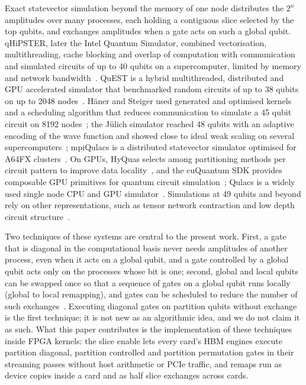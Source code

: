 \documentclass[pdflatex,sn-mathphys-num]{sn-jnl}
\theoremstyle{thmstyleone}
\theoremstyle{thmstylethree}
\begin{document}
Exact statevector simulation beyond the memory of one node distributes the $2^n$ amplitudes over many processes,
each holding a contiguous slice selected by the top qubits, and exchanges amplitudes when a gate acts on such a global
qubit. qHiPSTER, later the Intel Quantum Simulator, combined vectorisation, multithreading, cache blocking and
overlap of computation with communication and simulated circuits of up to 40 qubits on a supercomputer, limited by
memory and network bandwidth~\cite{smelyanskiy2016qhipster,guerreschi2020intel}. QuEST is a hybrid multithreaded,
distributed and GPU accelerated simulator that benchmarked random circuits of up to 38 qubits on up to 2048 nodes~\cite{jones2019quest}.
H\"aner and Steiger used generated and optimised kernels and a scheduling algorithm that reduces communication to
simulate a 45 qubit circuit on 8192 nodes~\cite{haner2017petabyte}; the J\"ulich simulator reached 48 qubits with an
adaptive encoding of the wave function and showed close to ideal weak scaling on several supercomputers~\cite{deraedt2019massively};
mpiQulacs is a distributed statevector simulator optimised for A64FX clusters~\cite{imamura2022mpiqulacs}. On GPUs,
HyQuas selects among partitioning methods per circuit pattern to improve data locality~\cite{zhang2021hyquas}, and the
cuQuantum SDK provides composable GPU primitives for quantum circuit simulation~\cite{bayraktar2023cuquantum};
Qulacs is a widely used single node CPU and GPU simulator~\cite{suzuki2021qulacs}. Simulations at 49 qubits and beyond
rely on other representations, such as tensor network contraction and low depth circuit
structure~\cite{markov2008simulating,pednault2017breaking,chen2018sixtyfour,boixo2018characterizing,villalonga2019flexible}.

Two techniques of these systems are central to the present work. First, a gate that is diagonal in the computational
basis never needs amplitudes of another process, even when it acts on a global qubit, and a gate controlled by a
global qubit acts only on the processes whose bit is one; second, global and local qubits can be swapped once so that
a sequence of gates on a global qubit runs locally (global to local remapping), and gates can be scheduled to reduce
the number of such exchanges~\cite{haner2017petabyte}. Executing diagonal gates on partition qubits without exchange is the
first technique; it is not new as an algorithmic idea, and we do not claim it as such. What this paper contributes is the
implementation of these techniques inside FPGA kernels: the slice enable lets every card's HBM engines execute
partition diagonal, partition controlled and partition permutation gates in their streaming passes without host
arithmetic or PCIe traffic, and remaps run as device copies inside a card and as half slice exchanges across cards.
\end{document}
